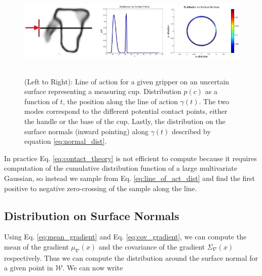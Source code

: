 \documentclass[letterpaper, 10 pt, conference]{ieeeconf}  %
\begin{document}
\begin{figure}[ht!]
\centering
\includegraphics[width = 17cm, height = 4.5cm]{figures/Slide04.jpg}
\caption{(Left to Right): Line of action for a given gripper on an uncertain surface representing a measuring cup. Distribution $p(c)$ as a function of $t$, the position along the line of action $\gamma(t)$. The two modes correspond to the different potential contact points, either the handle or the base of the cup. Lastly, the distribution on the surface normals (inward pointing) along $\gamma(t)$ described by equation \ref{eq:normal_dist}. }
\vspace*{-10pt}
\label{fig:GraspDist}
\end{figure}

In practice Eq. \ref{eq:contact_theory} is not efficient to compute because it requires computation of the cumulative distribution function of a large multivariate Gaussian, so instead we sample from Eq. \ref{eq:line_of_act_dist} and find the first positive to negative zero-crossing of the sample along the line. 






\subsection{Distribution on Surface Normals} 
Using Eq. \ref{eq:mean_gradient} and Eq. \ref{eq:cov_gradient}, we can compute the mean of the gradient $ \mu_{\nabla}(x)$ and the covariance of the gradient $\Sigma_{\nabla}(x)$ respectively. Thus we can compute the distribution around the surface normal for a given point in $\mathcal{W}$. We can now write 
\end{document}
